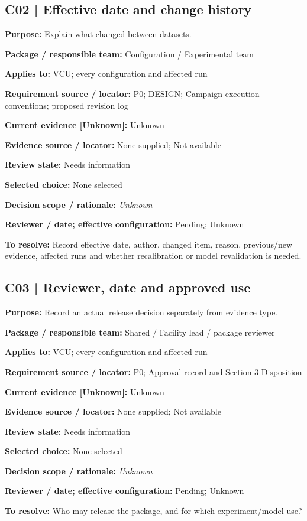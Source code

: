 \documentclass[11pt]{article}
\begin{document}
\begin{minipage}{\textwidth}\small\setlength{\parskip}{2pt}
\subsection*{C02 | Effective date and change history}
\textbf{Purpose:} Explain what changed between datasets.\par
\textbf{Package / responsible team:} Configuration / Experimental team\par
\textbf{Applies to:} VCU; every configuration and affected run\par
\textbf{Requirement source / locator:} P0; DESIGN; Campaign execution conventions; proposed revision log\par
\textbf{Current evidence [Unknown]:} Unknown\par
\textbf{Evidence source / locator:} None supplied; Not available\par
\textbf{Review state:} Needs information\par
\textbf{Selected choice:} None selected\par
\textbf{Decision scope / rationale:} \textit{Unknown}\par
\textbf{Reviewer / date; effective configuration:} Pending; Unknown\par
\textbf{To resolve:} Record effective date, author, changed item, reason, previous/new evidence, affected runs and whether recalibration or model revalidation is needed.\par
\end{minipage}\par\vspace{5pt}
\begin{minipage}{\textwidth}\small\setlength{\parskip}{2pt}
\subsection*{C03 | Reviewer, date and approved use}
\textbf{Purpose:} Record an actual release decision separately from evidence type.\par
\textbf{Package / responsible team:} Shared / Facility lead / package reviewer\par
\textbf{Applies to:} VCU; every configuration and affected run\par
\textbf{Requirement source / locator:} P0; Approval record and Section 3 Disposition\par
\textbf{Current evidence [Unknown]:} Unknown\par
\textbf{Evidence source / locator:} None supplied; Not available\par
\textbf{Review state:} Needs information\par
\textbf{Selected choice:} None selected\par
\textbf{Decision scope / rationale:} \textit{Unknown}\par
\textbf{Reviewer / date; effective configuration:} Pending; Unknown\par
\textbf{To resolve:} Who may release the package, and for which experiment/model use?\par
\end{minipage}\par\vspace{5pt}
\end{document}
